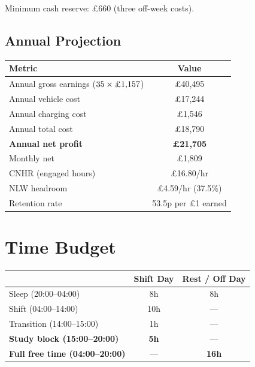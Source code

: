 \documentclass[a4paper,11pt]{article}
\begin{document}
\medskip
Minimum cash reserve: \pounds660 (three off-week costs).

\subsection{Annual Projection}

\begin{tabularx}{\textwidth}{X C}
\toprule
\textbf{Metric} & \textbf{Value} \\
\midrule
Annual gross earnings ($35 \times \text{\pounds1,157}$) & \pounds40,495 \\
Annual vehicle cost & \pounds17,244 \\
Annual charging cost & \pounds1,546 \\
Annual total cost & \pounds18,790 \\
 \textbf{Annual net profit} & \textbf{\pounds21,705} \\
Monthly net & \pounds1,809 \\
CNHR (engaged hours) & \pounds16.80/hr \\
NLW headroom & \pounds4.59/hr (37.5\%) \\
Retention rate & 53.5p per \pounds1 earned \\
\bottomrule
\end{tabularx}

\newpage

\section{Time Budget}

\begin{tabularx}{\textwidth}{X C C}
\toprule
& \textbf{Shift Day} & \textbf{Rest / Off Day} \\
\midrule
Sleep (20:00--04:00) & 8h & 8h \\
Shift (04:00--14:00) & 10h & --- \\
Transition (14:00--15:00) & 1h & --- \\
 \textbf{Study block (15:00--20:00)} & \textbf{5h} & --- \\
 \textbf{Full free time (04:00--20:00)} & --- & \textbf{16h} \\
\bottomrule
\end{tabularx}
\end{document}
